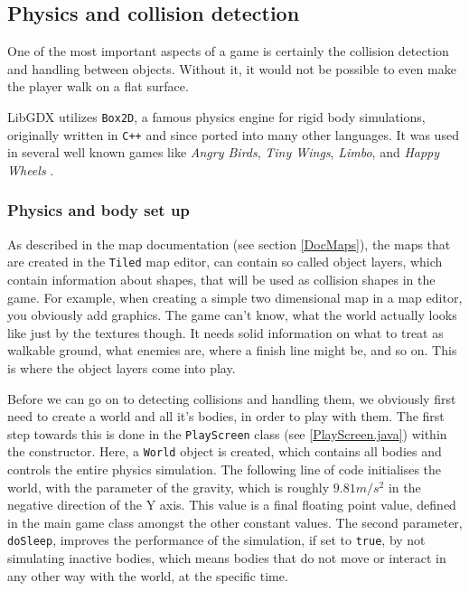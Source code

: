 \documentclass[12p]{article}
\begin{document}

\subsection{Physics and collision detection} \label{DocCollisions}

One of the most important aspects of a game is certainly the collision detection and handling between objects. Without it, it would not be possible to even make the player walk on a flat surface.

LibGDX utilizes \texttt{Box2D}, a famous physics engine for rigid body simulations, originally written in \texttt{C++} and since ported into many other languages. It was used in several well known games like \emph{Angry Birds}, \emph{Tiny Wings}, \emph{Limbo}, and \emph{Happy Wheels} \cite{box2DGithub}\cite{box2DWikipedia}.

\subsubsection{Physics and body set up} \label{DocPhysicsAndBodySetup}

As described in the map documentation (see section \ref{DocMaps}), the maps that are created in the \texttt{Tiled} map editor, can contain so called object layers, which contain information about shapes, that will be used as collision shapes in the game. For example, when creating a simple two dimensional map in a map editor, you obviously add graphics. The game can't know, what the world actually looks like just by the textures though. It needs solid information on what to treat as walkable ground, what enemies are, where a finish line might be, and so on. This is where the object layers come into play.

Before we can go on to detecting collisions and handling them, we obviously first need to create a world and all it's bodies, in order to play with them. The first step towards this is done in the \texttt{PlayScreen} class (see \ref{PlayScreen.java}) within the constructor. Here, a \texttt{World} object is created, which contains all bodies and controls the entire physics simulation. The following line of code initialises the world, with the parameter of the gravity, which is roughly $9.81m/s^2$ in the negative direction of the Y axis. This value is a final floating point value, defined in the main game class amongst the other constant values. The second parameter, \texttt{doSleep}, improves the performance of the simulation, if set to \texttt{true}, by not simulating inactive bodies, which means bodies that do not move or interact in any other way with the world, at the specific time.
\end{document}
